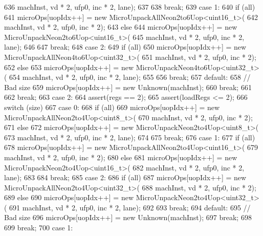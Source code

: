 \begin{DoxyCode}
{{{{636                         machInst, vd * 2, ufp0, inc * 2, lane);
637             }
638             break;
639           case 1:
640             if (all) {
641                 microOps[uopIdx++] = new MicroUnpackAllNeon2to6Uop<uint16_t>(
642                         machInst, vd * 2, ufp0, inc * 2);
643             } else {
644                 microOps[uopIdx++] = new MicroUnpackNeon2to6Uop<uint16_t>(
645                         machInst, vd * 2, ufp0, inc * 2, lane);
646             }
647             break;
648           case 2:
649             if (all) {
650                 microOps[uopIdx++] = new MicroUnpackAllNeon4to6Uop<uint32_t>(
651                         machInst, vd * 2, ufp0, inc * 2);
652             } else {
653                 microOps[uopIdx++] = new MicroUnpackNeon4to6Uop<uint32_t>(
654                         machInst, vd * 2, ufp0, inc * 2, lane);
655             }
656             break;
657           default:
658             // Bad size
659             microOps[uopIdx++] = new Unknown(machInst);
660             break;
661         }
662         break;
663       case 2:
664         assert(regs == 2);
665         assert(loadRegs <= 2);
666         switch (size) {
667           case 0:
668             if (all) {
669                 microOps[uopIdx++] = new MicroUnpackAllNeon2to4Uop<uint8_t>(
670                         machInst, vd * 2, ufp0, inc * 2);
671             } else {
672                 microOps[uopIdx++] = new MicroUnpackNeon2to4Uop<uint8_t>(
673                         machInst, vd * 2, ufp0, inc * 2, lane);
674             }
675             break;
676           case 1:
677             if (all) {
678                 microOps[uopIdx++] = new MicroUnpackAllNeon2to4Uop<uint16_t>(
679                         machInst, vd * 2, ufp0, inc * 2);
680             } else {
681                 microOps[uopIdx++] = new MicroUnpackNeon2to4Uop<uint16_t>(
682                         machInst, vd * 2, ufp0, inc * 2, lane);
683             }
684             break;
685           case 2:
686             if (all) {
687                 microOps[uopIdx++] = new MicroUnpackAllNeon2to4Uop<uint32_t>(
688                         machInst, vd * 2, ufp0, inc * 2);
689             } else {
690                 microOps[uopIdx++] = new MicroUnpackNeon2to4Uop<uint32_t>(
691                         machInst, vd * 2, ufp0, inc * 2, lane);
692             }
693             break;
694           default:
695             // Bad size
696             microOps[uopIdx++] = new Unknown(machInst);
697             break;
698         }
699         break;
700       case 1:
}}
\end{DoxyCode}
